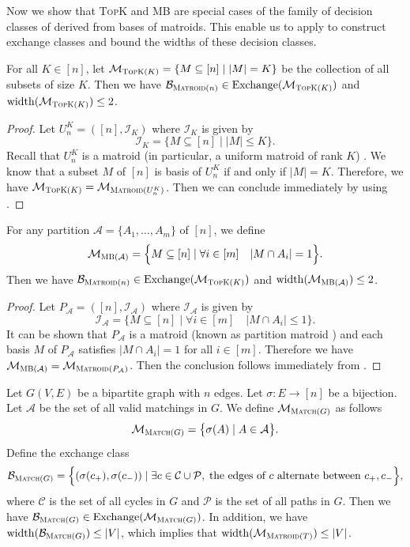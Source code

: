 \documentclass{article}
\newcommand{\M}{\mathcal M}
\newcommand{\B}{\mathcal B}
\DeclareMathOperator{\rank}{width}
\DeclareMathOperator{\Exchange}{Exchange}
\newcommand{\MultiIdent}{\textsc{TopK}\xspace}
\newcommand{\MultiBandit}{\textsc{MB}\xspace}
\newcommand{\Matroid}{\textsc{Matroid}\xspace}
\newcommand{\Match}{\textsc{Match}\xspace}
\begin{document}
Now we show that \MultiIdent and \MultiBandit are special cases of the family of decision classes of derived from bases of matroids. 
This enable us to apply  to construct exchange classes and bound the widths of these decision classes.

\begin{fact}[\MultiIdent]
\label{fact:topk}
For all $K \in [n]$, let $\M_{\MultiIdent(K)} = \{M\subseteq [n] \mid |M| = K\}$ be the collection of all subsets of size $K$.
Then we have $\B_{\Matroid(n)} \in \Exchange(\M_{\MultiIdent(K)})$ and $\rank(\M_{\MultiIdent(K)}) \le 2$.
\end{fact}
\begin{proof}
Let $U_n^K = ([n], \mathcal I_{K})$ where $\mathcal I_K$ is given by
$$
\mathcal I_K = \big\{M\subseteq[n] \mid |M| \le K\}.
$$
Recall that $U_n^K$ is a matroid (in particular, a uniform matroid of rank $K$) \citep{oxley2006matroid}.
We know that a subset $M$ of $[n]$ is basis of $U_n^K$ if and only if $|M|=K$.
Therefore, we have $\M_{\MultiIdent(K)}=\M_{\Matroid(U_n^K)}$. 
Then we can conclude immediately by using .
\end{proof}


\begin{fact}[\MultiBandit]
\label{fact:multibandit}
For any partition $\mathcal A =\{A_1,\ldots,A_m\}$ of $[n]$, we define
$$\M_{\MultiBandit(\mathcal A)} = \Big\{M\subseteq [n] \mid \forall i\in[m] \quad |M\cap A_i| = 1\Big\}.$$
Then we have $\B_{\Matroid(n)} \in \Exchange(\M_{\MultiIdent(K)})$ and  $\rank(\M_{\MultiBandit(\mathcal A)}) \le 2$.
\end{fact}

\begin{proof}
Let $P_{\mathcal A}=([n], \mathcal I_{\mathcal A})$ where $\mathcal I_{\mathcal A}$ is given by
$$
\mathcal I_{\mathcal A} = \big\{M \subseteq [n] \mid \forall i\in[m] \quad |M\cap A_i| \le 1 \big\}.
$$
It can be shown that $P_{\mathcal A}$ is a matroid (known as partition matroid \citep{oxley2006matroid}) and each basis $M$ of $P_{\mathcal A}$
satisfies $|M\cap A_i| = 1$ for all $i\in [m]$.
Therefore we have $\M_{\MultiBandit(\mathcal A)}=\M_{\Matroid(P_{\mathcal A})}$. 
Then the conclusion follows immediately from .
\end{proof}


\begin{fact}[Matching]
\label{fact:match}
Let $G(V,E)$ be a bipartite graph with $n$ edges.
Let $\sigma\colon E\rightarrow [n]$ be a bijection.
Let $\mathcal A$ be the set of all valid matchings in $G$. 
We define $\M_{\Match(G)}$ as follows
$$
\M_{\Match(G)} = \big\{\sigma(A) \mid A\in\mathcal A \big\}.
$$
Define the exchange class
$$
\B_{\Match(G)} = \Big\{(\sigma(c_+),\sigma(c_-)) \mid \exists c\in \mathcal C\cup \mathcal P,\; \text{the edges of }c\text{ alternate between } c_+,c_-\Big\},
$$
where $\mathcal C$ is the set of all cycles in $G$ and $\mathcal P$ is the set of all paths in $G$.
Then we have $\B_{\Match(G)} \in \Exchange(\M_{\Match(G)})$. 
In addition, we have $\rank(\B_{\Match(G)}) \le |V|$, which implies that $\rank(\M_{\Matroid(T)}) \le |V|$. 
\end{fact}
\end{document}
